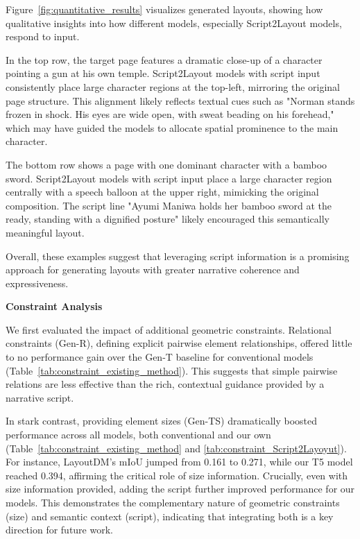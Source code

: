 Figure~\ref{fig:quantitative_results} visualizes generated layouts, showing how qualitative insights into how different models, especially Script2Layout models, respond to input.

In the top row, the target page features a dramatic close-up of a character pointing a gun at his own temple. Script2Layout models with script input consistently place large character regions at the top-left, mirroring the original page structure. This alignment likely reflects textual cues such as "Norman stands frozen in shock. His eyes are wide open, with sweat beading on his forehead," which may have guided the models to allocate spatial prominence to the main character.

The bottom row shows a page with one dominant character with a bamboo sword. Script2Layout models with script input place a large character region centrally with a speech balloon at the upper right, mimicking the original composition.  The script line "Ayumi Maniwa holds her bamboo sword at the ready, standing with a dignified posture" likely encouraged this semantically meaningful layout.

Overall, these examples suggest that leveraging script information is a promising approach for generating layouts with greater narrative coherence and expressiveness.


\vspace{0.5em}
\noindent\textbf{Constraint Analysis}

We first evaluated the impact of additional geometric constraints. Relational constraints (Gen-R), defining explicit pairwise element relationships, offered little to no performance gain over the Gen-T baseline for conventional models (Table~\ref{tab:constraint_existing_method}). This suggests that simple pairwise relations are less effective than the rich, contextual guidance provided by a narrative script.

In stark contrast, providing element sizes (Gen-TS) dramatically boosted performance across all models, both conventional and our own (Table~\ref{tab:constraint_existing_method} and \ref{tab:constraint_Script2Layoyut}). For instance, LayoutDM's mIoU jumped from 0.161 to 0.271, while our T5 model reached 0.394, affirming the critical role of size information. Crucially, even with size information provided, adding the script further improved performance for our models. This demonstrates the complementary nature of geometric constraints (size) and semantic context (script), indicating that integrating both is a key direction for future work.

